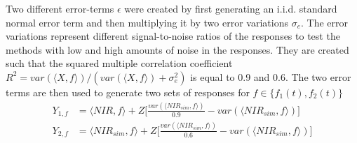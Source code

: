 \documentclass[11pt,twoside,a4paper]{article}
\begin{document}
		 Two different error-terms $\epsilon$ were created by first generating an i.i.d. standard normal error term and then multiplying it by two error variations $\sigma_e $. The error variations represent different signal-to-noise ratios of the responses to test the methods with low and high amounts of noise in the responses. They are created such that the squared multiple correlation coefficient $R^2 = var(\langle X, f\rangle) / (var(\langle X, f\rangle) + \sigma^2_{e})$ is equal to 0.9 and 0.6. The two error terms are then used to generate two sets of responses for $f \in \{f_1(t), f_2(t)\}$	
		\begin{equation}
			\begin{split}
				Y_{1,f} & = \langle NIR, f\rangle + Z  \biggl\lbrack\frac{var(\langle NIR_{sim}, f\rangle)}{0.9} - var(\langle NIR_{sim}, f\rangle)\biggr\rbrack \\
				Y_{2,f} & = \langle NIR_{sim}, f\rangle + Z  \biggl\lbrack\frac{var(\langle NIR_{sim}, f\rangle)}{0.6} - var(\langle NIR_{sim}, f\rangle)\biggr\rbrack
			\end{split}
		\end{equation}
		
\end{document}
